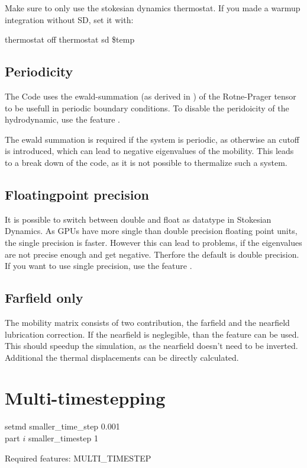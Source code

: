 Make sure to only use the stokesian dynamics thermostat. If you made a warmup
integration without SD, set it with:
\begin{tclcode}
thermostat off
thermostat sd \$temp
\end{tclcode}

\subsection{Periodicity}
The Code uses the ewald-summation (as derived in \cite{beenakker86a}) of the
Rotne-Prager tensor to be usefull in periodic boundary conditions. To disable
the peridoicity of the hydrodynamic, use the feature
. 

The ewald summation is required if the system is periodic, as otherwise an
cutoff is introduced, which can lead to negative eigenvalues of the
mobility. This leads to a break down of the code, as it is not possible to
thermalize such a system.

\subsection{Floatingpoint precision}
It is possible to switch between double and float as datatype in Stokesian
Dynamics. As GPUs have more single than double precision floating point
units, the single precision is faster. However this can lead to problems, if
the eigenvalues are not precise enough and get negative. Therfore the default
is double precision. If you want to use single precision, use the feature
.

\subsection{Farfield only}
The mobility matrix consists of two contribution, the farfield and the
nearfield lubrication correction.
If the nearfield is neglegible, than the feature  can be
used.
This should speedup the simulation, as the nearfield doesn't need to be
inverted. Additional the thermal displacements can be directly calculated.

\section{Multi-timestepping}

\begin{essyntax}
  setmd smaller\_time\_step 0.001 \\
  part $i$ smaller\_timestep 1

  Required features: MULTI\_TIMESTEP
\end{essyntax}

